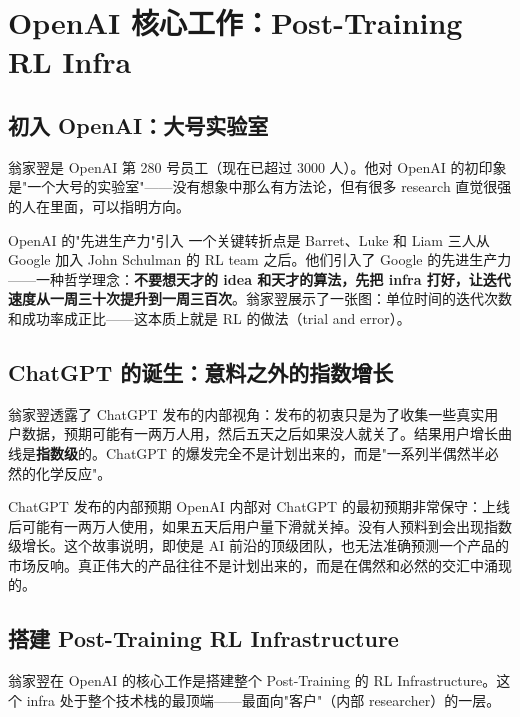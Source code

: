 \section{OpenAI 核心工作：Post-Training RL Infra}

\subsection{初入 OpenAI：大号实验室}

翁家翌是 OpenAI 第 280 号员工（现在已超过 3000 人）。他对 OpenAI 的初印象是"一个大号的实验室"——没有想象中那么有方法论，但有很多 research 直觉很强的人在里面，可以指明方向。

\begin{importantbox}{OpenAI 的"先进生产力"引入}
一个关键转折点是 Barret、Luke 和 Liam 三人从 Google 加入 John Schulman 的 RL team 之后。他们引入了 Google 的先进生产力——一种哲学理念：\textbf{不要想天才的 idea 和天才的算法，先把 infra 打好，让迭代速度从一周三十次提升到一周三百次}。翁家翌展示了一张图：单位时间的迭代次数和成功率成正比——这本质上就是 RL 的做法（trial and error）。
\end{importantbox}

\subsection{ChatGPT 的诞生：意料之外的指数增长}

翁家翌透露了 ChatGPT 发布的内部视角：发布的初衷只是为了收集一些真实用户数据，预期可能有一两万人用，然后五天之后如果没人就关了。结果用户增长曲线是\textbf{指数级}的。ChatGPT 的爆发完全不是计划出来的，而是"一系列半偶然半必然的化学反应"。

\begin{knowledgebox}{ChatGPT 发布的内部预期}
OpenAI 内部对 ChatGPT 的最初预期非常保守：上线后可能有一两万人使用，如果五天后用户量下滑就关掉。没有人预料到会出现指数级增长。这个故事说明，即使是 AI 前沿的顶级团队，也无法准确预测一个产品的市场反响。真正伟大的产品往往不是计划出来的，而是在偶然和必然的交汇中涌现的。
\end{knowledgebox}

\subsection{搭建 Post-Training RL Infrastructure}

翁家翌在 OpenAI 的核心工作是搭建整个 Post-Training 的 RL Infrastructure。这个 infra 处于整个技术栈的最顶端——最面向"客户"（内部 researcher）的一层。


